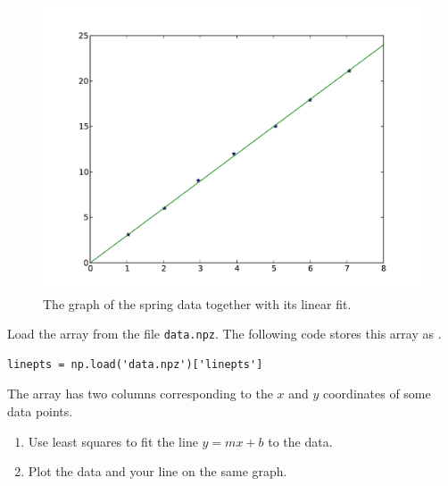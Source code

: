 \begin{figure}
\includegraphics[width=\textwidth]{line_lstsq}
\caption{The graph of the spring data together with its linear fit.}
\label{fig:spring_fit}
\end{figure}

\begin{problem}
Load the  array from the file \texttt{data.npz}. The following code stores this array as .
\begin{lstlisting}
linepts = np.load('data.npz')['linepts']
\end{lstlisting}
The  array has two columns corresponding to the $x$ and $y$ coordinates of some data points.
\begin{enumerate}
\item Use least squares to fit the line $y=mx+b$ to the data.
\item Plot the data and your line on the same graph.
\end{enumerate}
\end{problem}






